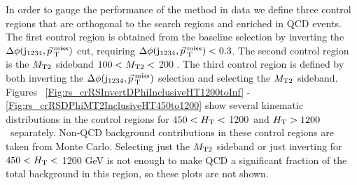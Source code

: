 In order to gauge the performance of the \rs method in data we define three control regions that are orthogonal to the search regions and enriched in QCD events.
The first control region is obtained from the baseline selection by inverting the $\Delta\phi(\mathrm{j}_{1234},\vec{p}_{\> \mathrm{T}}^{\> \mathrm{miss}})$ cut, requiring $\Delta\phi(\mathrm{j}_{1234},\vec{p}_{\> \mathrm{T}}^{\> \mathrm{miss}}) < 0.3$. The second control region is the $M_{\mathrm{T2}}$
sideband $100< M_{\mathrm{T2}} <$ 200 \GeV. The third control region is defined by both inverting the $\Delta\phi(\mathrm{j}_{1234},\vec{p}_{\> \mathrm{T}}^{\> \mathrm{miss}})$ selection and selecting the $M_{\mathrm{T2}}$ sideband. Figures
~\ref{Fig:rs_crRSInvertDPhiInclusiveHT1200toInf} - \ref{Fig:rs_crRSDPhiMT2InclusiveHT450to1200} show several kinematic distributions in the control regions for
$450 <H_{\mathrm{T}}<$ 1200~\GeV and $H_{\mathrm{T}} > 1200$~\GeV separately. Non-QCD background contributions in these control regions are taken from Monte Carlo. Selecting just the $M_{\mathrm{T2}}$
sideband or just inverting \dphimet for $450<H_{\mathrm{T}}<$ 1200 GeV is not enough to make QCD a significant fraction of the total background in this \Ht region,
 so these plots are not shown.

